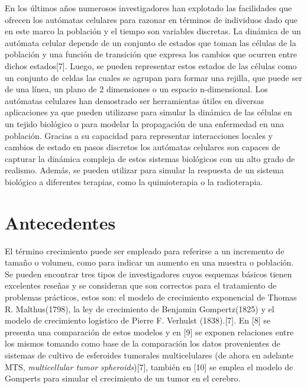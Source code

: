 \hspace{.1cm}En los últimos años numerosos investigadores han explotado las facilidades que ofrecen los autómatas celulares para razonar en términos de individuos dado que en este marco la población y el tiempo son variables discretas. La dinámica de un autómata celular depende de un conjunto de estados que toman las células de la población y una función de transición que expresa los cambios que ocurren entre dichos estados[7]. Luego, se pueden representar estos estados de las células como un conjunto de celdas las cuales se agrupan para formar una rejilla, que puede ser de una línea, un plano de 2 dimensiones o un espacio n-dimensional. Los autómatas celulares han demostrado ser herramientas útiles en diversas aplicaciones ya que pueden utilizarse para simular la dinámica de las células en un tejido biológico o para modelar la propagación de una enfermedad en una población. Gracias a su capacidad para representar interacciones locales y cambios de estado en pasos discretos los autómatas celulares son capaces de capturar la dinámica compleja de estos sistemas biológicos con un alto grado de realismo. Además, se pueden utilizar para simular la respuesta de un sistema biológico a diferentes terapias, como la quimioterapia o la radioterapia.

\section{Antecedentes} 
\hspace{.1cm}El término crecimiento puede ser empleado para referirse a un incremento de tamaño o volumen, como para indicar un aumento en una muestra o poblaci\'on. Se pueden encontrar tres tipos de investigadores cuyos esquemas básicos tienen excelentes reseñas y se consideran que son correctos para el tratamiento de problemas prácticos, estos son: el modelo de crecimiento exponencial de Thomas R. Malthus(1798), la ley de crecimiento de Benjamin Gompertz(1825) y el modelo de crecimiento log\'istico de Pierre F. Verhulst (1838).[7]. En [8] se presenta una comparación de estos modelos y en [9] se exponen relaciones entre los mismos tomando como base de la comparación los datos provenientes de sistemas de cultivo de esferoides tumorales multicelulares (de ahora en adelante MTS, \textit{multicellular tumor spheroids})[7], también en [10] se emplea el modelo de Gomperts para simular el crecimiento de un tumor en el cerebro.

